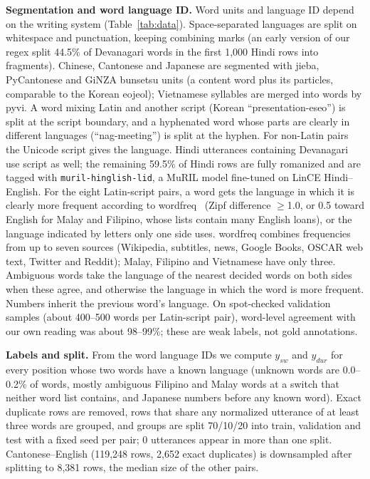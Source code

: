 \documentclass[sigconf]{acmart}
\begin{document}
\textbf{Segmentation and word language ID.} Word units and language ID depend on the writing system
(Table~\ref{tab:data}). Space-separated languages are split on whitespace and punctuation, keeping combining marks
(an early version of our regex split 44.5\% of Devanagari words in the first 1,000 Hindi rows into fragments). Chinese, Cantonese and Japanese are
segmented with jieba, PyCantonese and GiNZA bunsetsu units (a content word plus its particles, comparable to the
Korean eojeol); Vietnamese syllables are merged into words by pyvi. A word mixing Latin and another script
(Korean ``presentation-eseo'') is split at the script boundary, and a hyphenated word whose parts are clearly in different
languages (``nag-meeting'') is split at the hyphen. For non-Latin pairs the Unicode script gives the language. Hindi
utterances containing Devanagari use script as well; the remaining 59.5\% of Hindi rows are
fully romanized and are tagged with \texttt{muril-hinglish-lid}, a MuRIL model fine-tuned on LinCE Hindi--English.
For the eight Latin-script pairs, a word gets the language in which it is clearly more frequent according to
wordfreq~\cite{speer2022wordfreq} (Zipf difference $\geq$1.0, or 0.5 toward English for Malay and Filipino, whose
lists contain many English loans), or the language indicated by letters only one side uses. wordfreq combines frequencies from up to seven sources
(Wikipedia, subtitles, news, Google Books, OSCAR web text, Twitter and Reddit); Malay, Filipino and Vietnamese
have only three. Ambiguous words take the
language of the nearest decided words on both sides when these agree, and otherwise the language in which the
word is more frequent. Numbers inherit the previous word's language. On spot-checked
validation samples (about 400--500 words per Latin-script pair), word-level agreement with our own reading was about
98--99\%; these are weak labels, not gold annotations.

\textbf{Labels and split.} From the word language IDs we compute $y_{sw}$ and $y_{dur}$ for every position whose two
words have a known language (unknown words are 0.0--0.2\% of words, mostly ambiguous Filipino and Malay words at a switch that neither word list contains, and
Japanese numbers before any known word). Exact duplicate
rows are removed, rows that share any normalized utterance of at least three words are grouped, and groups are split 70/10/20 into train, validation and
test with a fixed seed per pair; 0 utterances appear in more than one split. Cantonese--English
(119,248 rows, 2,652 exact duplicates) is downsampled after splitting
to 8,381 rows, the median size of the other pairs.
\end{document}
